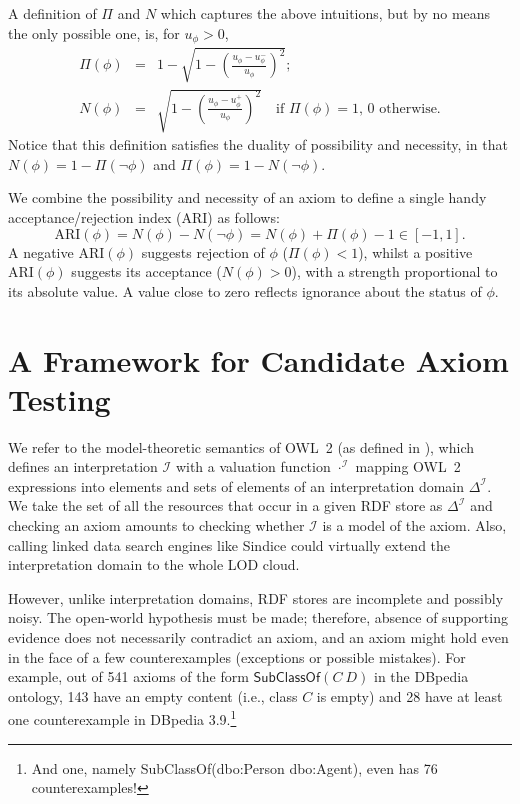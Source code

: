 \documentclass{llncs}
\begin{document}
A definition of $\Pi$ and $N$ which captures the above intuitions, but by no means
the only possible one, is, for $u_\phi > 0$,
\begin{eqnarray}
  \Pi(\phi) &=& 1 - \sqrt{1 - \left(\frac{u_\phi - u_\phi^-}{u_\phi}\right)^2}; \\
  N(\phi) &=& \sqrt{1 - \left(\frac{u_\phi - u_\phi^+}{u_\phi}\right)^2}\quad
    \mbox{if $\Pi(\phi) = 1$, 0 otherwise.}
\end{eqnarray}
Notice that this definition satisfies the duality of possibility and necessity,
in that $N(\phi) = 1 - \Pi(\neg\phi)$ and $\Pi(\phi) = 1 - N(\neg\phi)$.

We combine the possibility and necessity of an axiom to define
a single handy acceptance/rejection index (ARI) as follows:
\begin{equation}\label{eq:ARI}
  \mathrm{ARI}(\phi) = N(\phi) - N(\neg\phi) = N(\phi) + \Pi(\phi) - 1 \in [-1, 1].
\end{equation}
A negative $\mathrm{ARI}(\phi)$ suggests rejection of $\phi$ ($\Pi(\phi)<1$),
whilst a positive $\mathrm{ARI}(\phi)$ suggests its acceptance ($N(\phi)>0$),
with a strength proportional to its absolute value. A value close to zero
reflects ignorance about the status of $\phi$.

\section{A Framework for Candidate Axiom Testing}
\label{OWL2SPARQL} 
We refer to the model-theoretic semantics of OWL~2  (as defined in \cite{OWL2-direct-semantics}),
which defines an interpretation $\mathcal{I}$ with a valuation function
$\cdot^\mathcal{I}$ mapping OWL~2 expressions into
elements and sets of elements of an interpretation domain $\Delta^\mathcal{I}$.
We take the set of all the resources that occur in a given RDF store 
as $\Delta^\mathcal{I}$ and checking an axiom amounts to checking
whether $\mathcal{I}$ is a model of the axiom. Also, calling linked data search engines
like Sindice could virtually extend the interpretation domain to the whole LOD cloud.

However, unlike interpretation domains, RDF stores are incomplete and
possibly noisy. The open-world hypothesis must be made; therefore, absence of
supporting evidence does not necessarily contradict an axiom, and an axiom might
hold even in the face of a few counterexamples (exceptions or possible mistakes).
For example, out of 541 axioms of the form $\mathsf{SubClassOf}(C\ D)$ in the DBpedia
ontology, 143 have an empty content (i.e., class $C$ is empty)
and 28 have at least one counterexample in DBpedia 3.9.\footnote{And one, namely
\textsf{SubClassOf}(\textsf{dbo:Person} \textsf{dbo:Agent}), even has 76 counterexamples!}
\end{document}
